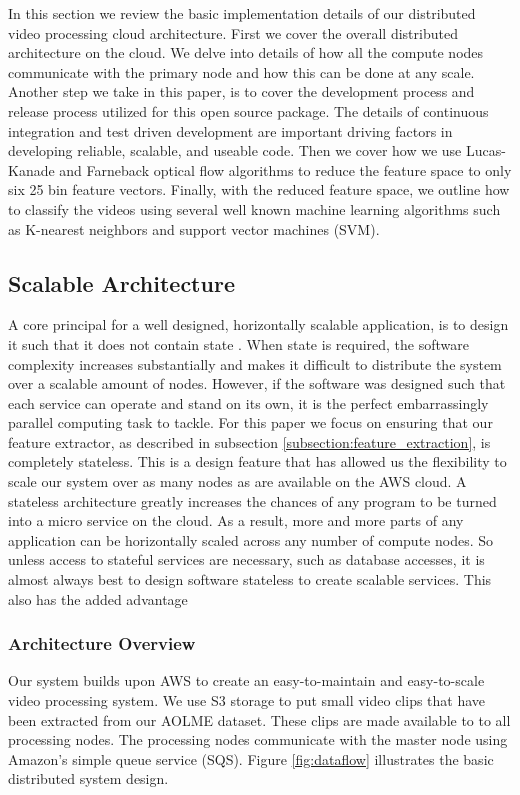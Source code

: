 \PARstart In this section we review the basic implementation details of our distributed
video processing cloud architecture. First we cover the overall distributed
architecture on the cloud.  We delve into details of how all the compute nodes
communicate with the primary node and how this can be done at any scale. Another
step we take in this paper,  is to cover the development process and release
process utilized for this open source package. The details of continuous
integration and test driven development are  important driving factors in
developing reliable, scalable, and useable code.  Then we cover how we use
Lucas-Kanade and Farneback optical flow algorithms to reduce the feature space
to only six 25 bin feature vectors. Finally, with the reduced feature space, we
outline how to classify the videos using several well known machine learning
algorithms such as K-nearest neighbors and support vector machines (SVM).

\subsection{\label{subsection:distributed_processing}Scalable Architecture}
A core principal for a well designed, horizontally scalable application, is
to design it such that it does not contain state \cite{awsbestpractices}.
When state is required, the software complexity increases substantially and
makes it difficult to distribute the system over a scalable amount of nodes.
However, if the software was designed such that each service can operate and
stand on its own, it is the perfect embarrassingly parallel computing task to
tackle. For this paper we focus on ensuring that our feature extractor,
as described in subsection \ref{subsection:feature_extraction}, is completely stateless.
This is a design feature that has allowed us the flexibility to scale our
system over as many nodes as are available on the AWS cloud. A stateless architecture
greatly increases the chances of any program to be turned into a micro service
on the cloud. As a result, more and more parts of any application can  be horizontally scaled
across any number of compute nodes. So unless access to stateful services are
necessary, such as database accesses, it is almost always best to design
software stateless to create scalable services. This also has the added advantage


\subsubsection{\label{subsubsection:architecture_overview}Architecture Overview}
Our system builds upon AWS to create an easy-to-maintain and easy-to-scale
video processing system. We use S3 storage to put small video clips that
have been extracted from our AOLME dataset. These clips are made available to
to all processing nodes. The processing nodes communicate with the master
node using Amazon's simple queue service (SQS). Figure \ref{fig:dataflow} illustrates
the basic distributed system design.

